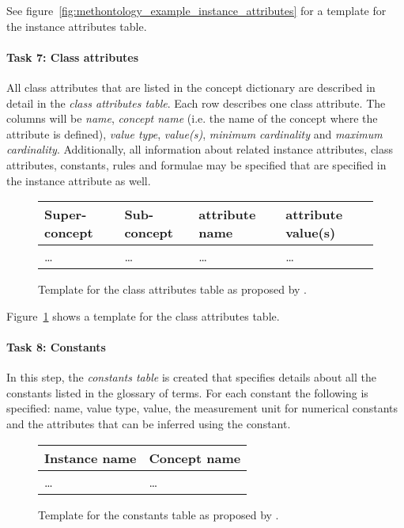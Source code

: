 See figure~\ref{fig:methontology_example_instance_attributes} for a template for the instance attributes table.

\paragraph{Task 7: Class attributes}

All class attributes that are listed in the concept dictionary are described in detail in the \emph{class attributes table}. Each row describes one class attribute. The columns will be \emph{name}, \emph{concept name} (i.e. the name of the concept where the attribute is defined), \emph{value type}, \emph{value(s)}, \emph{minimum cardinality} and \emph{maximum cardinality}. Additionally, all information about related instance attributes, class attributes, constants, rules and formulae may be specified that are specified in the instance attribute as well.

\begin{figure}
\centering
\begin{tabular}{|p{}|p{}|p{}|p{}|}
  \hline
  \textbf{Super-concept} & \textbf{Sub-concept} & \textbf{attribute name} & \textbf{attribute value(s)} \\
  \hline\hline
  … & … & … & … \\
  \hline
\end{tabular}
\caption{Template for the class attributes table as proposed by \methontology.}
\label{fig:methontology_example_class_attributes}
\end{figure}

Figure~\ref{fig:methontology_example_class_attributes} shows a template for the class attributes table.

\paragraph{Task 8: Constants}

In this step, the \emph{constants table} is created that specifies details about all the constants listed in the glossary of terms. For each constant the following is specified: name, value type, value, the measurement unit for numerical constants and the attributes that can be inferred using the constant.

\begin{figure}
\centering
\begin{tabular}{|p{}|p{}|}
  \hline
  \textbf{Instance name} & \textbf{Concept name} \\
  \hline\hline
  … & … \\
  \hline
\end{tabular}
\caption{Template for the constants table as proposed by \methontology.}
\label{fig:methontology_example_constants}
\end{figure}

